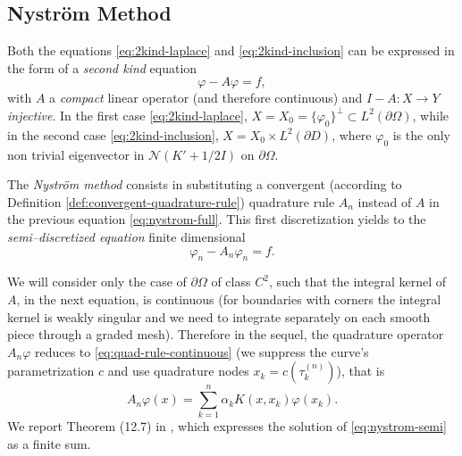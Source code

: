 \documentclass[10pt, a4paper, twoside, openright]{book}
\theoremstyle{definition}
\theoremstyle{plain}
\theoremstyle{plain}
\theoremstyle{plain}
\theoremstyle{plain}
\theoremstyle{plain}
\theoremstyle{plain}
\theoremstyle{plain}
\theoremstyle{plain}
\let\phi\varphi
\begin{document}
\subsection{Nystr\"om Method}
Both the equations \eqref{eq:2kind-laplace} and \eqref{eq:2kind-inclusion} can be expressed in the form of 
a \emph{second kind} equation
\begin{equation}
\label{eq:nystrom-full}
 \phi-A\phi = f,
\end{equation}
with $A$ a \emph{compact} linear operator (and therefore continuous) and $I-A:X\to Y$ \emph{injective}. 
In the first case \eqref{eq:2kind-laplace}, $X=X_0=\{\phi_0\}^\perp \subset L^2(\partial \Omega)$, 
while in the second case \eqref{eq:2kind-inclusion}, $X=X_0\times L^2(\partial D)$, where $\phi_0$ is the only non trivial eigenvector in $\mathcal{N}(K' + 1/2I)$ on $\partial\Omega$.
\par
The \emph{Nystr\"om method} consists in substituting a convergent (according to Definition \ref{def:convergent-quadrature-rule}) 
quadrature rule $A_n$ instead of $A$ in the previous equation \eqref{eq:nystrom-full}. 
This first discretization yields to the \emph{semi--discretized equation} finite dimensional
\begin{equation}
\label{eq:nystrom-semi}
 \phi_n - A_n\phi_n = f.
\end{equation}
\par
We will consider only the case of $\partial \Omega$ of class $C^2$, such that the 
integral kernel of $A$, in the next equation, is continuous 
(for boundaries with corners the integral kernel is weakly singular and we need to integrate separately on each smooth piece through a graded mesh).
Therefore in the sequel, the quadrature operator $A_n\phi$ reduces to \eqref{eq:quad-rule-continuous} (we suppress the curve's parametrization $c$ and use quadrature nodes $x_k=c(\tau_k^{(n)})$), that is
\begin{equation}
\label{eq:quad-rule-continuous-synt}
 A_n\phi(x) = \sum_{k=1}^n\alpha_k K(x,x_k)\phi(x_k).
\end{equation}
We report Theorem (12.7) in \cite{kress:book}, which expresses the solution of \eqref{eq:nystrom-semi} as a finite sum.
\end{document}
